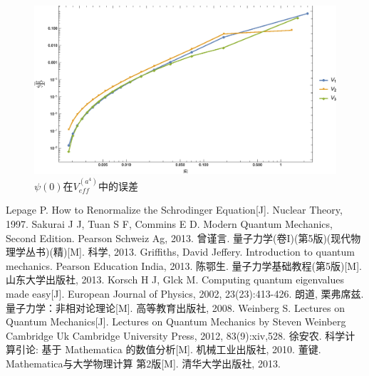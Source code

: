 \documentclass[hyperref,cs4size,titlepage,twoside]{ctexart}
\begin{document}
\begin{figure}[!htbp]
  \centering
  \includegraphics[width=6in]{MultiplePotential_8.eps}
  \caption{$\psi(0)$在$V_{eff}^{(a^4)}$中的误差}
\end{figure}
\clearpage
\begin{thebibliography}{b}

Lepage P. How to Renormalize the Schrodinger Equation[J]. Nuclear Theory, 1997.
Sakurai J J, Tuan S F, Commins E D. Modern Quantum Mechanics, Second Edition. Pearson Schweiz Ag, 2013.
曾谨言. 量子力学(卷I)(第5版)(现代物理学丛书)(精)[M]. 科学, 2013.
Griffiths, David Jeffery. Introduction to quantum mechanics. Pearson Education India, 2013.
陈鄂生. 量子力学基础教程(第5版)[M]. 山东大学出版社, 2013.
Korsch H J, Glck M. Computing quantum eigenvalues made easy[J]. European Journal of Physics, 2002, 23(23):413-426.
朗道, 栗弗席兹. 量子力学：非相对论理论[M]. 高等教育出版社, 2008.
Weinberg S. Lectures on Quantum Mechanics[J]. Lectures on Quantum Mechanics by Steven Weinberg Cambridge Uk Cambridge University Press, 2012, 83(9):xiv,528.
徐安农. 科学计算引论: 基于 Mathematica 的数值分析[M]. 机械工业出版社, 2010.
董键. Mathematica与大学物理计算 第2版[M]. 清华大学出版社, 2013.
\end{thebibliography}
\end{document}
